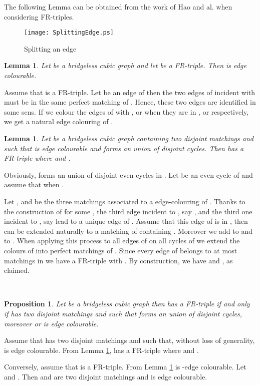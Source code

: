 \documentclass{amsart}
\newtheorem{lem}[thm]{Lemma}
\newtheorem{prop}[thm]{Proposition}
\theoremstyle{definition}
\theoremstyle{remark}
\newenvironment{prf}{{\bf \noindent Proof } }{\hfill\\}
\begin{document}
The following Lemma can be obtained from the work of Hao and
al. \cite{HaoNiuWanZhaZha2009} when considering FR-triples.

\begin{figure}
\texttt{[image: SplittingEdge.ps]}
\caption{ Splitting an edge}
\label{Figure:SplittingEdge}
\end{figure}

\begin{lem} \label{Lemma:FRGBarreT2}
Let  be a bridgeless cubic graph and let  be a
FR-triple. Then  is edge colourable.
\end{lem}
\begin{prf}



Assume that  is a FR-triple.  Let  be an
edge of  then the two edges of  incident with 
must be in the same perfect matching of . Hence, these
two edges are identified in some sens.  If we colour the edges of
 with ,  or  when they are in ,  or
 respectively, we get a natural edge colouring of
.
\end{prf}

\begin{lem} \label{Lemma:GBarreA1FR}
Let  be a bridgeless cubic graph containing  two disjoint
matchings  and  such that  is
edge colourable and  forms an union of disjoint cycles. Then  has a FR-triple   where
 and .
\end{lem}
\begin{prf}
Obviously, forms an union of disjoint even cycles
in . Let  be an even cycle of
 and assume that  when .

Let ,  and   be the three matchings associated
to a  edge-colouring of .  Thanks to the
construction of  for some , the
third edge incident to , say , and the third one incident to
, say  lead to a unique  edge of .
Assume that this edge of  is in , then
 can be extended naturally to a matching of  containing
. Moreover we add  to  and 
to . When applying this process to all edges of  on all
cycles of  we extend the colours of
 into perfect matchings of . Since every edge
of  belongs to at most  matchings in 
we have a FR-triple with . By
construction, we have  and , as claimed.

\end{prf}


\begin{prop} \label{Proposition:EquivalenceStructureFR}
Let  be a bridgeless cubic graph then  has a FR-triple if and
only if  has  two disjoint matchings  and  such
that  forms an union of disjoint cycles, moreover  or  is edge
colourable.
\end{prop}
\begin{prf}
Assume that  has  two disjoint matchings  and  such
that, without loss of generality,  is edge
colourable. From Lemma \ref{Lemma:GBarreA1FR},  has a FR-triple
 where  and .


Conversely, assume that  is a FR-triple. From Lemma
\ref{Lemma:FRGBarreT2}  is -edge
colourable.  Let  and . Then  and  are two disjoint matchings and  is
edge colourable.
\end{prf}
\end{document}

